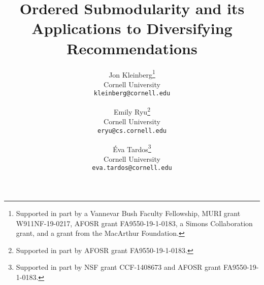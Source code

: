 \documentclass{article}
\title{Ordered Submodularity and its Applications to Diversifying Recommendations}
\author{
    Jon Kleinberg\thanks{Supported in part by a Vannevar Bush Faculty Fellowship, MURI grant W911NF-19-0217, AFOSR grant FA9550-19-1-0183, a Simons Collaboration grant, and a grant from the MacArthur Foundation.}\\
    Cornell University\\
    \texttt{kleinberg@cornell.edu}
    \and
    Emily Ryu\thanks{Supported in part by AFOSR grant FA9550-19-1-0183.}\\
    Cornell University\\
    \texttt{eryu@cs.cornell.edu}
    \and
    \'Eva Tardos\thanks{Supported in part by NSF grant CCF-1408673 and AFOSR grant FA9550-19-1-0183.}\\
    Cornell University\\
    \texttt{eva.tardos@cornell.edu}
}
\newcommand{\1}[1]{\mathds{1}_{\left[#1\right]}}
\begin{document}
\maketitle

\begin{abstract}
    
\end{abstract}















\newpage
\appendix

\end{document}
